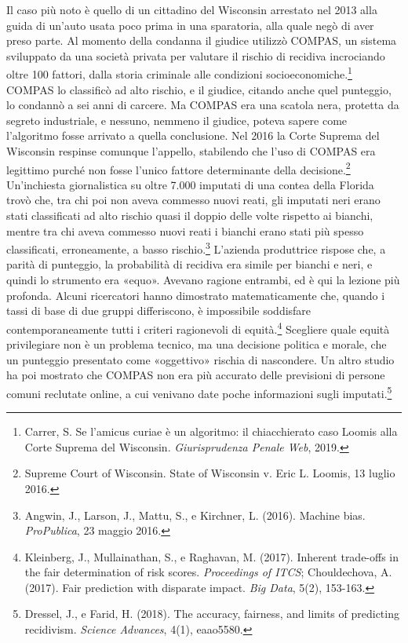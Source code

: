 Il caso pi\`{u} noto \`{e} quello di un cittadino del Wisconsin arrestato nel 2013 alla guida di un'auto usata poco prima in una sparatoria, alla quale negò di aver preso parte. Al momento della condanna il giudice utilizz\`{o} COMPAS, un sistema sviluppato da una societ\`{a} privata per valutare il rischio di recidiva incrociando oltre 100 fattori, dalla storia criminale alle condizioni socioeconomiche.\footnote{Carrer, S. Se l'amicus curiae \`{e} un algoritmo: il chiacchierato caso Loomis alla Corte Suprema del Wisconsin. \textit{Giurisprudenza Penale Web}, 2019.} COMPAS lo classific\`{o} ad alto rischio, e il giudice, citando anche quel punteggio, lo condann\`{o} a sei anni di carcere. Ma COMPAS era una scatola nera, protetta da segreto industriale, e nessuno, nemmeno il giudice, poteva sapere come l'algoritmo fosse arrivato a quella conclusione. Nel 2016 la Corte Suprema del Wisconsin respinse comunque l'appello, stabilendo che l'uso di COMPAS era legittimo purch\'{e} non fosse l'unico fattore determinante della decisione.\footnote{Supreme Court of Wisconsin. State of Wisconsin v. Eric L. Loomis, 13 luglio 2016.} Un'inchiesta giornalistica su oltre 7.000 imputati di una contea della Florida trovò che, tra chi poi non aveva commesso nuovi reati, gli imputati neri erano stati classificati ad alto rischio quasi il doppio delle volte rispetto ai bianchi, mentre tra chi aveva commesso nuovi reati i bianchi erano stati più spesso classificati, erroneamente, a basso rischio.\footnote{Angwin, J., Larson, J., Mattu, S., e Kirchner, L. (2016). Machine bias. \textit{ProPublica}, 23 maggio 2016.} L'azienda produttrice rispose che, a parità di punteggio, la probabilità di recidiva era simile per bianchi e neri, e quindi lo strumento era «equo». Avevano ragione entrambi, ed è qui la lezione più profonda. Alcuni ricercatori hanno dimostrato matematicamente che, quando i tassi di base di due gruppi differiscono, è impossibile soddisfare contemporaneamente tutti i criteri ragionevoli di equità.\footnote{Kleinberg, J., Mullainathan, S., e Raghavan, M. (2017). Inherent trade-offs in the fair determination of risk scores. \textit{Proceedings of ITCS}; Chouldechova, A. (2017). Fair prediction with disparate impact. \textit{Big Data}, 5(2), 153-163.} Scegliere quale equità privilegiare non è un problema tecnico, ma una decisione politica e morale, che un punteggio presentato come «oggettivo» rischia di nascondere. Un altro studio ha poi mostrato che COMPAS non era più accurato delle previsioni di persone comuni reclutate online, a cui venivano date poche informazioni sugli imputati.\footnote{Dressel, J., e Farid, H. (2018). The accuracy, fairness, and limits of predicting recidivism. \textit{Science Advances}, 4(1), eaao5580.}

